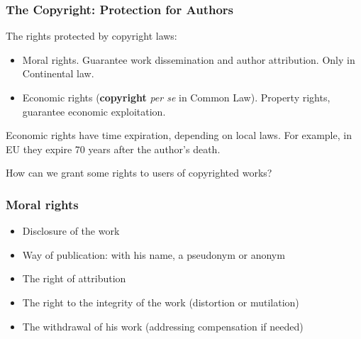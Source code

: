 
%
%
%


\begin{frame}
\frametitle{The Copyright: Protection for Authors}

The rights protected by copyright laws:
\begin{itemize}
\item \alert{Moral rights}. Guarantee work dissemination and author attribution.
Only in Continental law.
\item \alert{Economic rights} (\textbf{copyright} \textit{per se} in Common Law). Property rights, guarantee economic exploitation.
\end{itemize}

Economic rights have time expiration, depending on local laws. For
example, in EU they expire 70 years after the author's death.

\begin{center}
{\large How can we grant some rights to users of copyrighted works?}
\end{center}

\end{frame}


\begin{frame}
\frametitle{Moral rights}

\begin{itemize}
\item Disclosure of the work
\item Way of publication: with his name, a pseudonym or anonym
\item The right of attribution
\item The right to the integrity of the work (distortion or mutilation)
\item The withdrawal of his work (addressing compensation if needed)
\end{itemize}

\end{frame}

